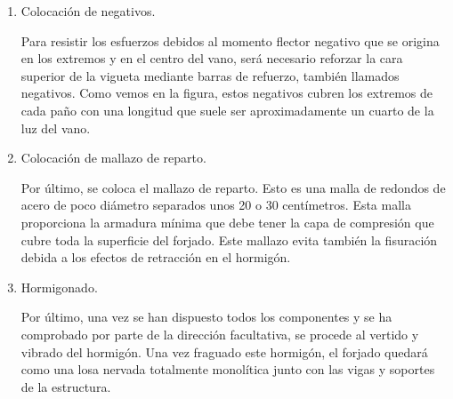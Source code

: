 \begin{enumerate}
    \item Colocación de negativos.
    
Para resistir los esfuerzos debidos al momento flector negativo que se origina en los extremos y en el centro del vano, será necesario reforzar la cara superior de la vigueta mediante barras de refuerzo, también llamados negativos. Como vemos en la figura, estos negativos cubren los extremos de cada paño con una longitud que suele ser aproximadamente un cuarto de la luz del vano.

    \item Colocación de mallazo de reparto.
    
Por último, se coloca el mallazo de reparto. Esto es una malla de redondos de acero de poco diámetro separados unos 20 o 30 centímetros. Esta malla proporciona la armadura mínima que debe tener la capa de compresión que cubre toda la superficie del forjado. Este mallazo evita también la fisuración debida a los efectos de retracción en el hormigón.

    \item Hormigonado.

Por último, una vez se han dispuesto todos los componentes y se ha comprobado por parte de la dirección facultativa, se procede al vertido y vibrado del hormigón. Una vez fraguado este hormigón, el forjado quedará como una losa nervada totalmente monolítica junto con las vigas y soportes de la estructura.

\end{enumerate}

